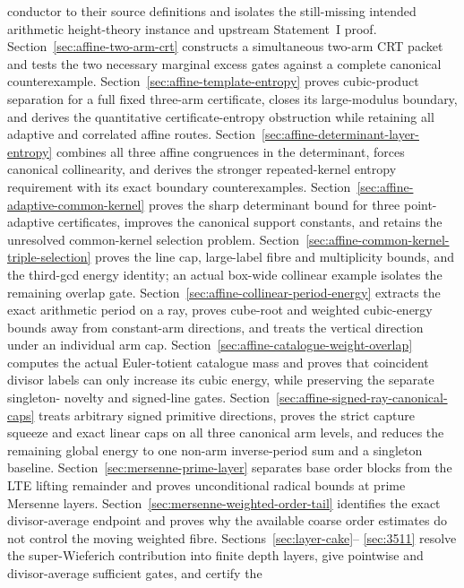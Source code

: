 \documentclass[11pt]{amsart}
\theoremstyle{definition}
\theoremstyle{remark}
\begin{document}
conductor to their source definitions and isolates the still-missing intended
arithmetic height-theory instance and upstream Statement~I proof.
Section~\ref{sec:affine-two-arm-crt} constructs a simultaneous two-arm CRT
packet and tests the two necessary marginal excess gates against a complete
canonical counterexample.
Section~\ref{sec:affine-template-entropy} proves cubic-product separation
for a full fixed three-arm certificate, closes its large-modulus boundary,
and derives the quantitative certificate-entropy obstruction while retaining
all adaptive and correlated affine routes.
Section~\ref{sec:affine-determinant-layer-entropy} combines all three affine
congruences in the determinant, forces canonical collinearity, and derives
the stronger repeated-kernel entropy requirement with its exact boundary
counterexamples.
Section~\ref{sec:affine-adaptive-common-kernel} proves the sharp determinant
bound for three point-adaptive certificates, improves the canonical support
constants, and retains the unresolved common-kernel selection problem.
Section~\ref{sec:affine-common-kernel-triple-selection} proves the line cap,
large-label fibre and multiplicity bounds, and the third-gcd energy identity;
an actual box-wide collinear example isolates the remaining overlap gate.
Section~\ref{sec:affine-collinear-period-energy} extracts the exact arithmetic
period on a ray, proves cube-root and weighted cubic-energy bounds away from
constant-arm directions, and treats the vertical direction under an
individual arm cap.
Section~\ref{sec:affine-catalogue-weight-overlap} computes the actual
Euler-totient catalogue mass and proves that coincident divisor labels can
only increase its cubic energy, while preserving the separate singleton-
novelty and signed-line gates.
Section~\ref{sec:affine-signed-ray-canonical-caps} treats arbitrary signed
primitive directions, proves the strict capture squeeze and exact linear
caps on all three canonical arm levels, and reduces the remaining global
energy to one non-arm inverse-period sum and a singleton baseline.
Section~\ref{sec:mersenne-prime-layer} separates base order blocks from the
LTE lifting remainder and proves unconditional radical bounds at prime
Mersenne layers.
Section~\ref{sec:mersenne-weighted-order-tail} identifies the exact
divisor-average endpoint and proves why the available coarse order estimates
do not control the moving weighted fibre.  Sections~\ref{sec:layer-cake}--
\ref{sec:3511} resolve the super-Wieferich contribution into finite depth
layers, give pointwise and divisor-average sufficient gates, and certify the
\end{document}
